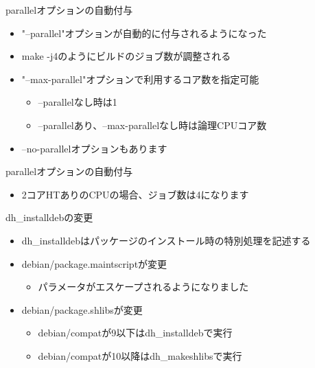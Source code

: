 \begin{frame}[containsverbatim]{parallelオプションの自動付与}
  \begin{itemize}
  \item "--parallel"オプションが自動的に付与されるようになった
  \item make -j4のようにビルドのジョブ数が調整される
  \item "--max-parallel"オプションで利用するコア数を指定可能
    \begin{itemize}
    \item --parallelなし時は1
    \item --parallelあり、--max-parallelなし時は論理CPUコア数
    \end{itemize}
  \item --no-parallelオプションもあります
  \end{itemize}
\end{frame}

\begin{frame}[containsverbatim]{parallelオプションの自動付与}
  \begin{itemize}
  \item 2コアHTありのCPUの場合、ジョブ数は4になります
  \end{itemize}
\end{frame}

\begin{frame}[containsverbatim]{dh\_installdebの変更}
  \begin{itemize}
  \item dh\_installdebはパッケージのインストール時の特別処理を記述する
  \item debian/package.maintscriptが変更
    \begin{itemize}
    \item パラメータがエスケープされるようになりました
    \end{itemize}
  \item debian/package.shlibsが変更
    \begin{itemize}
    \item debian/compatが9以下はdh\_installdebで実行
    \item debian/compatが10以降はdh\_makeshlibsで実行
    \end{itemize}
  \end{itemize}
\end{frame}

